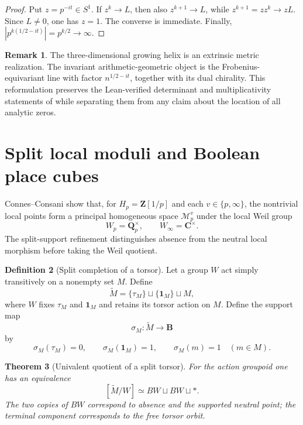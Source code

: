 \documentclass[11pt]{amsart}
\numberwithin{equation}{section}
\newtheorem{theorem}{Theorem}[section]
\theoremstyle{definition}
\newtheorem{definition}[theorem]{Definition}
\newtheorem{remark}[theorem]{Remark}
\newcommand{\B}{\mathbf B}
\newcommand{\Z}{\mathbf Z}
\newcommand{\Q}{\mathbf Q}
\newcommand{\C}{\mathbf C}
\newcommand{\cM}{\mathcal M}
\begin{document}
\begin{proof}
Put $z=p^{-it}\in S^1$.  If $z^k\to L$, then also
$z^{k+1}\to L$, while $z^{k+1}=zz^k\to zL$.  Since $L\neq0$, one has
$z=1$.  The converse is immediate.  Finally,
$|p^{k(1/2-it)}|=p^{k/2}\to\infty$.
\end{proof}

\begin{remark}
The three-dimensional growing helix is an extrinsic metric realization.
The invariant arithmetic-geometric object is the Frobenius-equivariant
line with factor $n^{1/2-it}$, together with its dual chirality.  This
reformulation preserves the Lean-verified determinant and multiplicativity
statements of \cite{Lavery} while separating them from any claim about the
location of all analytic zeros.
\end{remark}

\section{Split local moduli and Boolean place cubes}
\label{sec:split-local-moduli}

Connes--Consani show that, for $H_p=\Z[1/p]$ and each
$v\in\{p,\infty\}$, the nontrivial local points form a principal
homogeneous space $\cM_p^v$ under the local Weil group
\[
W_p=\Q_p^\times,
\qquad
W_\infty=\C^\times.
\]
The split-support refinement distinguishes absence from the neutral local
morphism before taking the Weil quotient.

\begin{definition}[Split completion of a torsor]
\label{def:split-torsor-completion}
Let a group $W$ act simply transitively on a nonempty set $M$.  Define
\[
\widetilde M=\{\tau_M\}\sqcup\{\mathbf1_M\}\sqcup M,
\]
where $W$ fixes $\tau_M$ and $\mathbf1_M$ and retains its torsor action on
$M$.  Define the support map
\[
\sigma_M:\widetilde M\to\B
\]
by
\[
\sigma_M(\tau_M)=0,
\qquad
\sigma_M(\mathbf1_M)=1,
\qquad
\sigma_M(m)=1\quad(m\in M).
\]
\end{definition}

\begin{theorem}[Univalent quotient of a split torsor]
\label{thm:split-torsor-groupoid}
For the action groupoid one has an equivalence
\[
\boxed{
[\widetilde M/W]\simeq BW\sqcup BW\sqcup *.
}
\]
The two copies of $BW$ correspond to absence and the supported neutral
point; the terminal component corresponds to the free torsor orbit.
\end{theorem}
\end{document}
